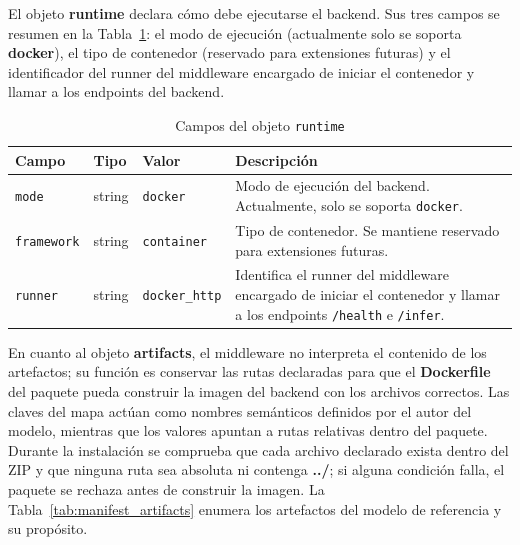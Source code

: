 El objeto \textbf{runtime} declara cómo debe ejecutarse el backend. Sus tres campos se resumen en la Tabla~\ref{tab:manifest_runtime}: el modo de ejecución (actualmente solo se soporta \textbf{docker}), el tipo de contenedor (reservado para extensiones futuras) y el identificador del runner del middleware encargado de iniciar el contenedor y llamar a los endpoints del backend.

\begin{table}[H]
\centering
\caption{Campos del objeto \texttt{runtime}}
\label{tab:manifest_runtime}
\scriptsize
\renewcommand{\arraystretch}{1.08}
\setlength{\tabcolsep}{3.5pt}

\begin{tabular}{
    >{\raggedright\arraybackslash}p{2.5cm}
    >{\raggedright\arraybackslash}p{1.7cm}
    >{\raggedright\arraybackslash}p{2.7cm}
    >{\raggedright\arraybackslash}p{6.5cm}
}
\toprule
\textbf{Campo} & \textbf{Tipo} & \textbf{Valor} & \textbf{Descripción} \\
\midrule
\texttt{mode} & string & \texttt{docker} & Modo de ejecución del backend. Actualmente, solo se soporta \texttt{docker}. \\
\texttt{framework} & string & \texttt{container} & Tipo de contenedor. Se mantiene reservado para extensiones futuras. \\
\texttt{runner} & string & \texttt{docker\_http} & Identifica el runner del middleware encargado de iniciar el contenedor y llamar a los endpoints \texttt{/health} e \texttt{/infer}. \\
\bottomrule
\end{tabular}
\end{table}

En cuanto al objeto \textbf{artifacts}, el middleware no interpreta el contenido de los artefactos; su función es conservar las rutas declaradas para que el \textbf{Dockerfile} del paquete pueda construir la imagen del backend con los archivos correctos. Las claves del mapa actúan como nombres semánticos definidos por el autor del modelo, mientras que los valores apuntan a rutas relativas dentro del paquete. Durante la instalación se comprueba que cada archivo declarado exista dentro del ZIP y que ninguna ruta sea absoluta ni contenga \textbf{../}; si alguna condición falla, el paquete se rechaza antes de construir la imagen. La Tabla~\ref{tab:manifest_artifacts} enumera los artefactos del modelo de referencia y su propósito.

